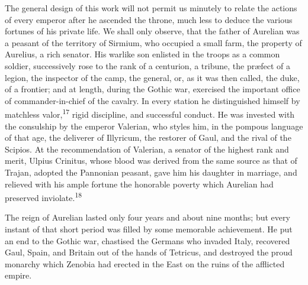 

The general design of this work will not permit us minutely to
relate the actions of every emperor after he ascended the throne,
much less to deduce the various fortunes of his private life. We
shall only observe, that the father of Aurelian was a peasant of
the territory of Sirmium, who occupied a small farm, the property
of Aurelius, a rich senator. His warlike son enlisted in the
troops as a common soldier, successively rose to the rank of a
centurion, a tribune, the præfect of a legion, the inspector of
the camp, the general, or, as it was then called, the duke, of a
frontier; and at length, during the Gothic war, exercised the
important office of commander-in-chief of the cavalry. In every
station he distinguished himself by matchless valor,\textsuperscript{17} rigid
discipline, and successful conduct. He was invested with the
consulship by the emperor Valerian, who styles him, in the
pompous language of that age, the deliverer of Illyricum, the
restorer of Gaul, and the rival of the Scipios. At the
recommendation of Valerian, a senator of the highest rank and
merit, Ulpius Crinitus, whose blood was derived from the same
source as that of Trajan, adopted the Pannonian peasant, gave him
his daughter in marriage, and relieved with his ample fortune the
honorable poverty which Aurelian had preserved inviolate.\textsuperscript{18}



The reign of Aurelian lasted only four years and about nine
months; but every instant of that short period was filled by some
memorable achievement. He put an end to the Gothic war, chastised
the Germans who invaded Italy, recovered Gaul, Spain, and Britain
out of the hands of Tetricus, and destroyed the proud monarchy
which Zenobia had erected in the East on the ruins of the
afflicted empire.

